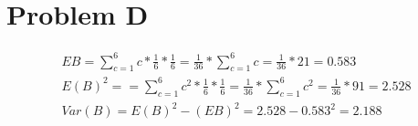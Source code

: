 \documentclass[12pt]{article}
\begin{document}
\section{Problem D}

\[
     \begin{aligned}
     
        EB =  \sum_{c=1}^{6} c * \frac{1}{6} * \frac{1}{6}  
        = \frac{1}{36}*\sum_{c=1}^{6} c 
        = \frac{1}{36} * 21 = 0.583 \\
        
        E(B)^2 = =  \sum_{c=1}^{6} c^2 * \frac{1}{6} * \frac{1}{6}  
        = \frac{1}{36}*\sum_{c=1}^{6} c^2 
        = \frac{1}{36} * 91 = 2.528 \\
        
        Var(B) =  E(B)^2 - (EB)^2 = 2.528 - 0.583^2 = 2.188
        
     \end{aligned}
\]
\end{document}
